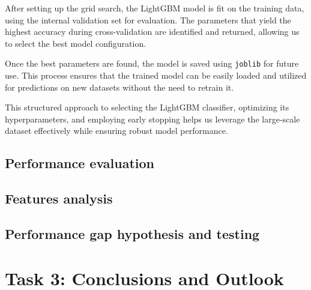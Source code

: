 \documentclass[a4paper,11pt]{article}
\begin{document}
After setting up the grid search, the LightGBM model is fit on the training data, using the internal validation set for evaluation. The parameters that yield the highest accuracy during cross-validation are identified and returned, allowing us to select the best model configuration. 

Once the best parameters are found, the model is saved using \texttt{joblib} for future use. This process ensures that the trained model can be easily loaded and utilized for predictions on new datasets without the need to retrain it. 

This structured approach to selecting the LightGBM classifier, optimizing its hyperparameters, and employing early stopping helps us leverage the large-scale dataset effectively while ensuring robust model performance.

\subsection{Performance evaluation}

\subsection{Features analysis}

\subsection{Performance gap hypothesis and testing}

\section{Task 3: Conclusions and Outlook}




\newpage
\nocite{*}

\end{document}
